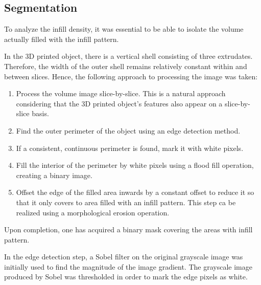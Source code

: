 \documentclass[a4paper,twoside,12pt]{article}
\begin{document}
\subsection{Segmentation}
To analyze the infill density, it was essential to be able to isolate the volume actually filled with the infill pattern.

In the 3D printed object, there is a vertical shell consisting of three extrudates. Therefore, the width of the outer shell remains relatively constant within and between slices. Hence, the following approach to processing the image was taken:
\begin{enumerate}
    \item Process the volume image slice-by-slice. This is a natural approach considering that the 3D printed object's features also appear on a slice-by-slice basis.
    \item Find the outer perimeter of the object using an edge detection method.
    \item If a consistent, continuous perimeter is found, mark it with white pixels.
    \item Fill the interior of the perimeter by white pixels using a flood fill operation, creating a binary image.
    \item \label{step:erosion} Offset the edge of the filled area inwards by a constant offset to reduce it so that it only covers to area filled with an infill pattern. This step ca be realized using a morphological erosion operation.
\end{enumerate}
Upon completion, one has acquired a binary mask covering the areas with infill pattern.

In the edge detection step, a Sobel filter on the original grayscale image was initially used to find the magnitude of the image gradient. The grayscale image produced by Sobel was thresholded in order to mark the edge pixels as white.
\end{document}
